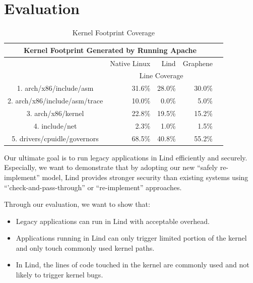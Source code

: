 \section{Evaluation}
\label{sec.evaluation}


\begin{table}[t]
\begin{tabular*}{\textwidth}{c @{\extracolsep{\fill}} rrrr}
\toprule
\multicolumn{4}{c}{Kernel Footprint Generated by Running Apache} \\

\midrule
 & Native Linux    &  Lind & Graphene \\
\cmidrule(r){2-4}
& \multicolumn{3}{c}{Line Coverage} \\
\midrule
1. arch/x86/include/asm                 & 31.6\%          & 28.0\%    & 30.0\%      \\
2. arch/x86/include/asm/trace    &  10.0\%          & 0.0\%       &  5.0\%       \\
3. arch/x86/kernel                            &  22.8\%          & 19.5\%       & 15.2\%       \\
4. include/net                                     &  2.3\%            & 1.0\%       &  1.5\%          \\
5. drivers/cpuidle/governors         &  68.5\%          & 40.8\%       &  55.2\%       \\
\bottomrule
\end{tabular*}
\caption {Kernel Footprint Coverage}
\label{table:kernel_footprint_coverage}
\end{table}


\par
Our ultimate goal is to run legacy applications in Lind efficiently and securely. Especially, we want to demonstrate that by adopting our new ``safely re-implement'' model, Lind provides stronger security than existing systems using ``'check-and-pass-through'' or ``re-implement'' approaches. 


\par
Through our evaluation, we want to show that:

\begin{itemize} 
  
  \item Legacy applications can run in Lind with acceptable overhead. 
  
  \item Applications running in Lind can only trigger limited portion of the kernel and only touch commonly used kernel paths. 
  
  \item In Lind, the lines of code touched in the kernel are commonly used and not likely to trigger kernel bugs. 
  
\end{itemize}


